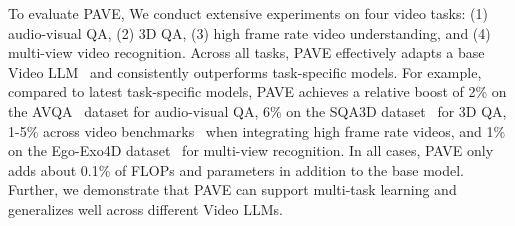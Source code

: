 
To evaluate PAVE, We conduct extensive experiments on four video tasks: (1) audio-visual QA, (2) 3D QA, (3) high frame rate video understanding, and (4) multi-view video recognition. Across all tasks, PAVE effectively adapts a base Video LLM~\cite{li2024llava} and consistently outperforms task-specific models. For example, compared to latest task-specific models, PAVE achieves a relative boost of 2\% on the AVQA~\cite{yang2022avqa} dataset for audio-visual QA, 6\% on the SQA3D dataset~\cite{ma2022sqa3d} for 3D QA, 1-5\% across video benchmarks~\cite{fu2024video, li2023mvbench, zhou2025mlvubenchmarkingmultitasklong} when integrating high frame rate videos, and 1\% on the Ego-Exo4D dataset~\cite{grauman2024ego} for multi-view recognition. In all cases, PAVE only adds about 0.1\% of FLOPs and parameters in addition to the base model. Further, we demonstrate that PAVE can support multi-task learning and generalizes well across different Video LLMs.


